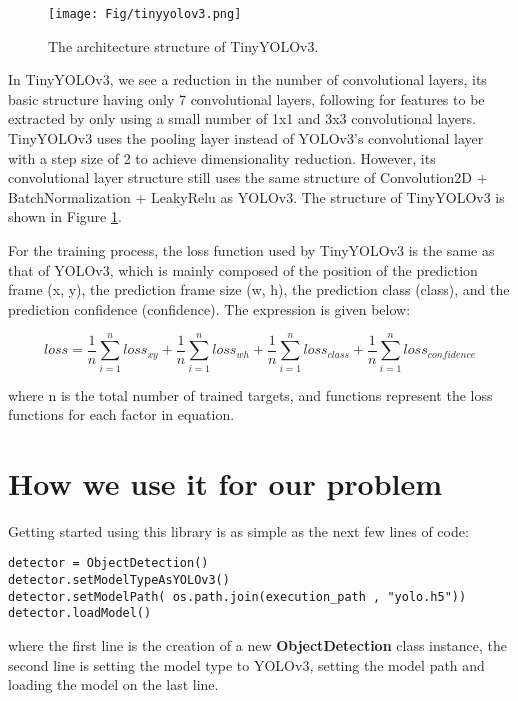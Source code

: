 \documentclass[runningheads,a4paper,11pt]{report}
\begin{document}
\begin{figure}[htbp]
	\centerline{\texttt{[image: Fig/tinyyolov3.png]}} 
	\caption{The architecture structure of TinyYOLOv3. \cite{Thenetwo22:online}}
	\label{fig:TinyYOLOv3Architecture}
\end{figure}

In TinyYOLOv3, we see a reduction in the number of convolutional layers, its basic structure having only 7 convolutional layers, following for features to be extracted by only using a small number of 1x1 and 3x3 convolutional layers. TinyYOLOv3 uses the pooling layer instead of YOLOv3's convolutional layer with a step size of 2 to achieve dimensionality reduction. However, its convolutional layer structure still uses the same structure of Convolution2D + BatchNormalization + LeakyRelu as YOLOv3. The structure of TinyYOLOv3 is shown in Figure \ref{fig:TinyYOLOv3Architecture}.

For the training process, the loss function used by TinyYOLOv3 is the same as that of YOLOv3, which is mainly composed of the position of the prediction frame (x, y), the prediction frame size (w, h), the prediction class (class), and the prediction confidence (confidence). The expression is given below:

\begin{equation}
loss = \frac{1}{n} \sum_{i=1}^{n} loss_{xy} + \frac{1}{n} \sum_{i=1}^{n} loss_{wh} + \frac{1}{n} \sum_{i=1}^{n} loss_{class} + \frac{1}{n} \sum_{i=1}^{n} loss_{confidence}
\end{equation}

where n is the total number of trained targets, and functions represent the loss functions for each factor in equation.

\section{How we use it for our problem}

Getting started using this library is as simple as the next few lines of code:
\begin{lstlisting}
detector = ObjectDetection()
detector.setModelTypeAsYOLOv3()
detector.setModelPath( os.path.join(execution_path , "yolo.h5"))
detector.loadModel()
\end{lstlisting}

where the first line is the creation of a new \textbf{ObjectDetection} class instance, the second line is setting the model type to YOLOv3, setting the model path and loading the model on the last line.
\end{document}
